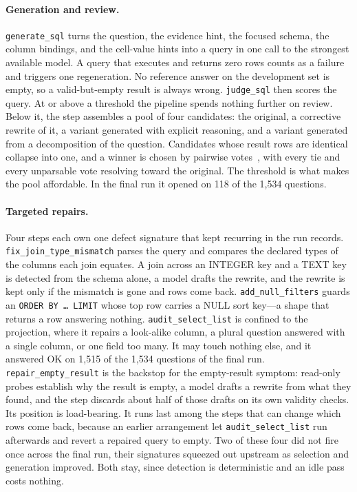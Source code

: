 \paragraph{Generation and review.} \texttt{generate\_sql} turns the question,
the evidence hint, the focused schema, the column bindings, and the cell-value
hints into a query in one call to the strongest available model. A query that
executes and returns zero rows counts as a failure and triggers one
regeneration. No reference answer on the development set is empty, so a
valid-but-empty result is always wrong. \texttt{judge\_sql} then scores the
query. At or above a threshold the pipeline spends nothing further on review.
Below it, the step assembles a pool of four candidates: the original, a
corrective rewrite of it, a variant generated with explicit reasoning, and a
variant generated from a decomposition of the question. Candidates whose result
rows are identical collapse into one, and a winner is chosen by pairwise
votes~\cite{agentar-scale-sql}, with every tie and every unparsable vote
resolving toward the original. The threshold is what makes the pool affordable.
In the final run it opened on 118 of the 1,534 questions.

\paragraph{Targeted repairs.} Four steps each own one defect signature that
kept recurring in the run records. \texttt{fix\_join\_type\_mismatch} parses
the query and compares the declared types of the columns each join equates. A
join across an INTEGER key and a TEXT key is detected from the schema alone, a
model drafts the rewrite, and the rewrite is kept only if the mismatch is gone
and rows come back. \texttt{add\_null\_filters} guards an \texttt{ORDER
BY \dots{} LIMIT} whose top row carries a NULL sort key---a shape that returns
a row answering nothing. \texttt{audit\_select\_list} is confined to the
projection, where it repairs a look-alike column, a plural question answered
with a single column, or one field too many. It may touch nothing else, and it
answered OK on 1,515 of the 1,534 questions of the final run.
\texttt{repair\_empty\_result} is the backstop for the empty-result symptom:
read-only probes establish why the result is empty, a model drafts a rewrite
from what they found, and the step discards about half of those drafts on its
own validity checks. Its position is load-bearing. It runs last among the steps
that can change which rows come back, because an earlier arrangement let
\texttt{audit\_select\_list} run afterwards and revert a repaired query to
empty. Two of these four did not fire once across the final run, their
signatures squeezed out upstream as selection and generation improved. Both
stay, since detection is deterministic and an idle pass costs nothing.

